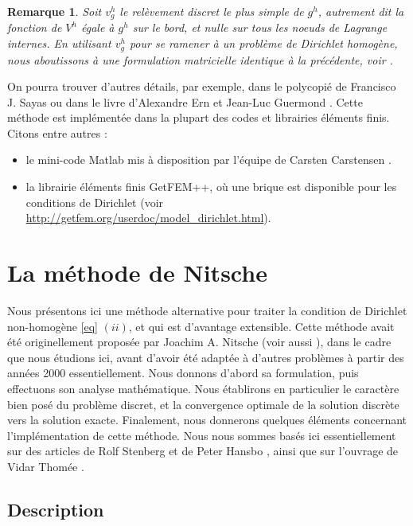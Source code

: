 \documentclass[11pt]{book}
\newtheorem{remark}[theorem]{Remarque}
\newcommand{\br}{\begin{remark}}
\newcommand{\er}{\end{remark}}
\begin{document}
\br
Soit $v^h_g$ le relèvement discret le plus simple de $g^h$, autrement dit la fonction de $V^h$ égale à $g^h$ sur le bord, et nulle sur tous les noeuds de Lagrange internes. En utilisant $v^h_g$ pour se ramener à un problème de Dirichlet homogène, nous aboutissons à une formulation matricielle identique à la précédente, voir \cite[\S 3.2.2. pp.124--126, Remark 8.17 p.378]{ern-guermond-04}.
\er

On pourra trouver d'autres détails, par exemple, dans le polycopié de Francisco J. Sayas \cite{sayas2008} ou dans le livre d'Alexandre Ern et Jean-Luc Guermond \cite{ern-guermond-04}. Cette méthode est implémentée dans la plupart des codes et librairies éléments finis. Citons entre autres :
\begin{itemize}
 \item le mini-code Matlab mis à disposition par l'équipe de Carsten Carstensen \cite{alberty-1999}.
 \item la librairie éléments finis GetFEM++, où une brique est disponible pour les conditions de Dirichlet (voir \url{http://getfem.org/userdoc/model_dirichlet.html}).
\end{itemize}

\section{La méthode de Nitsche}

Nous présentons ici une méthode alternative pour traiter la condition de Dirichlet non-homogène \eqref{eq} $(ii)$, et qui est d'avantage extensible. 
Cette méthode avait été originellement proposée par Joachim A. Nitsche \cite{nitsche-71} (voir aussi \cite{arnold-82}), dans le cadre que nous étudions ici, avant d'avoir été adaptée à d'autres problèmes à partir des années 2000 essentiellement.
Nous donnons d'abord sa formulation, puis effectuons son analyse mathématique. Nous établirons en particulier le caractère bien posé du problème discret, et la convergence optimale de la solution discrète vers la solution exacte. Finalement, nous donnerons quelques éléments concernant l'implémentation de cette méthode. Nous nous sommes basés ici essentiellement sur des articles de Rolf Stenberg \cite{stenberg-95} et de Peter Hansbo \cite{hansbo-05}, ainsi que sur l'ouvrage de Vidar Thomée \cite[Chapter 2]{thomee-97}. 

\subsection{Description}
\end{document}
